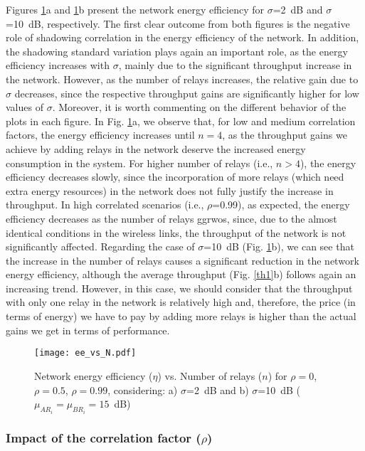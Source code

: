 \documentclass[12pt,draftcls, onecolumn]{IEEEtran}
\begin{document}
Figures \ref{ee1}a and \ref{ee1}b present the network energy efficiency for $\sigma$=2~dB and $\sigma$=10~dB, respectively. The first clear outcome from both figures is the negative role of shadowing correlation in the energy efficiency of the network. In addition, the shadowing standard variation plays again an important role, as the energy efficiency increases with $\sigma$, mainly due to the significant throughput increase in the network. However, as the number of relays increases, the relative gain due to $\sigma$ decreases, since the respective throughput gains are significantly higher for low values of $\sigma$. Moreover, it is worth commenting on the different behavior of the plots in each figure. In Fig. \ref{ee1}a, we observe that, for low and medium correlation factors, the energy efficiency increases until $n=4$, as the throughput gains we achieve by adding relays in the network deserve the increased energy consumption in the system. For higher number of relays (i.e., $n>4$), the energy efficiency decreases slowly, since the incorporation of more relays (which need extra energy resources) in the network does not fully justify the increase in throughput. In high correlated scenarios (i.e., $\rho$=0.99), as expected, the energy efficiency decreases as the number of relays ggrwos, since, due to the almost identical conditions in the wireless links, the throughput of the network is not significantly affected. Regarding the case of $\sigma$=10~dB (Fig. \ref{ee1}b), we can see that the increase in the number of relays causes a significant reduction in the network energy efficiency, although the average throughput (Fig. \ref{th1}b) follows again an increasing trend. However, in this case, we should consider that the throughput with only one relay in the network is relatively high and, therefore, the price (in terms of energy) we have to pay by adding more relays is higher than the actual gains we get in terms of performance.

\begin{figure}[htb]
\centering
\texttt{[image: ee\_vs\_N.pdf]}
\caption{Network energy efficiency ($\eta$) vs. Number of relays ($n$) for $\rho=0$, $\rho=0.5$, $\rho=0.99$, considering: a) $\sigma$=2~dB and b) $\sigma$=10~dB ($\mu_{AR_i}=\mu_{BR_i}=15$~dB)}\label{ee1}
\end{figure}

\subsubsection{Impact of the correlation factor ($\rho$)}
\end{document}
